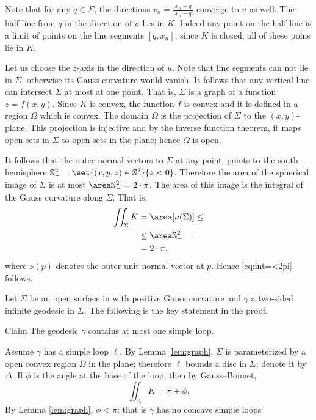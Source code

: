 Note that for any $q\in \Sigma$, the directions $v_n=\tfrac{x_n-q}{|x_n-q|}$ converge to $u$ as well.
The half-line from $q$ in the direction of $u$ lies in $K$.
Indeed any point on the half-line is a limit of points on the line segments $[q,x_n]$;
since $K$ is closed, all of these poins lie in $K$.


Let us choose the $z$-axis in the direction of $u$.
Note that line segments can not lie in $\Sigma$, otherwise its Gauss curvature would vanish.
It follows that any vertical line can intersect $\Sigma$ at most at one point.
That is, $\Sigma$ is a graph of a function $z=f(x,y)$.
Since $K$ is convex, the function $f$ is convex and it is defined in a region $\Omega$ which is convex.
The domain $\Omega$ is the projection of $\Sigma$ to the $(x,y)$-plane.
This projection is injective and by the inverse function theorem, it maps open sets in $\Sigma$ to open sets in the plane;
hence $\Omega$ is open.

It follows that the outer normal vectors to $\Sigma$ at any point, points to the south hemisphere $\mathbb{S}^2_-=\set{(x,y,z)\in\mathbb{S}^2}{z< 0}$.
Therefore the area of the spherical image of $\Sigma$ is at most $\area\mathbb{S}^2_-= 2\cdot\pi$.
The area of this image is the integral of the Gauss curvature along $\Sigma$.
That is,
\begin{align*}
\iint_{\Sigma}K&=\area[\nu(\Sigma)]\le 
\\
&\le \area\mathbb{S}^2_-=
\\
&=2\cdot\pi,
\end{align*}
where $\nu(p)$ denotes the outer unit normal vector at $p$.
Hence \ref{eq:int=<2pi} follows.
\qeds

Let $\Sigma$ be an open surface in with positive Gauss curvature and $\gamma$ a two-sided infinite geodesic in $\Sigma$.
The following is the key statement in the proof.

\begin{thm}{Claim}
The geodesic $\gamma$ contains at most one simple loop.
\end{thm}

Assume $\gamma$ has a simple loop $\ell$.
By Lemma \ref{lem:graph}, $\Sigma$ is parameterized by a open convex region $\Omega$ in the plane;
therefore $\ell$ bounds a disc in $\Sigma$; denote it by $\Delta$.
If $\phi$ is the angle at the base of the loop, then by Gauss--Bonnet,
\[\iint_\Delta K=\pi+\phi.\] 
By Lemma \ref{lem:graph}, $\phi<\pi$; that is $\gamma$ has no concave simple loops 

